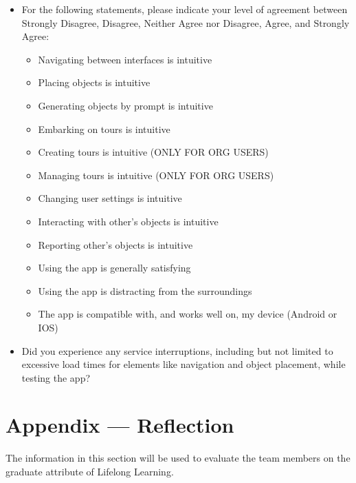 \documentclass[12pt, titlepage]{article}
\begin{document}
\begin{itemize}
  \item For the following statements, please indicate your level of agreement between Strongly Disagree, Disagree, Neither Agree nor Disagree, Agree, and Strongly Agree:
        \begin{itemize}
          \item Navigating between interfaces is intuitive
          \item Placing objects is intuitive
          \item Generating objects by prompt is intuitive
          \item Embarking on tours is intuitive
          \item Creating tours is intuitive (ONLY FOR ORG USERS)
          \item Managing tours is intuitive (ONLY FOR ORG USERS)
          \item Changing user settings is intuitive
          \item Interacting with other's objects is intuitive
          \item Reporting other's objects is intuitive
          \item Using the app is generally satisfying
          \item Using the app is distracting from the surroundings
          \item The app is compatible with, and works well on, my device (Android or IOS)
        \end{itemize}
  \item Did you experience any service interruptions, including but not limited to excessive load times for elements like navigation and object placement, while testing the app? \\
\end{itemize}

\newpage{}
\section*{Appendix --- Reflection}

The information in this section will be used to evaluate the team members on the
graduate attribute of Lifelong Learning.


\end{document}
